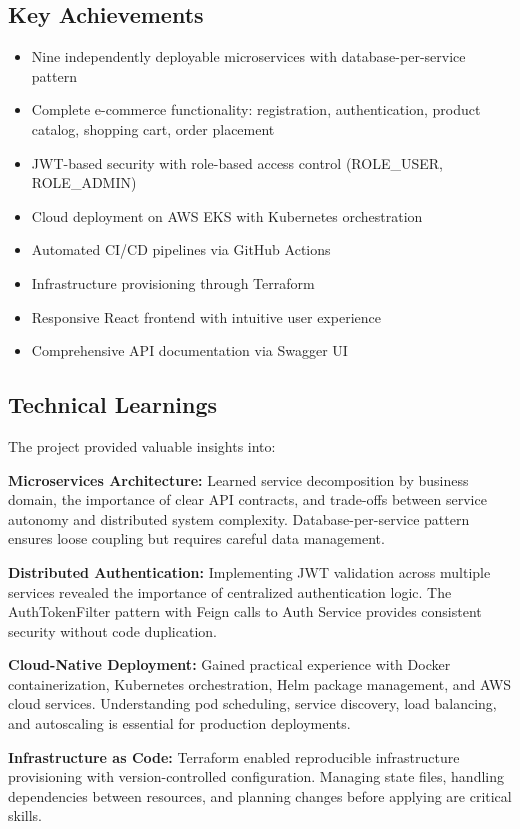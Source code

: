 \subsection{Key Achievements}

\begin{itemize}
    \item Nine independently deployable microservices with database-per-service pattern
    \item Complete e-commerce functionality: registration, authentication, product catalog, shopping cart, order placement
    \item JWT-based security with role-based access control (ROLE\_USER, ROLE\_ADMIN)
    \item Cloud deployment on AWS EKS with Kubernetes orchestration
    \item Automated CI/CD pipelines via GitHub Actions
    \item Infrastructure provisioning through Terraform
    \item Responsive React frontend with intuitive user experience
    \item Comprehensive API documentation via Swagger UI
\end{itemize}

\subsection{Technical Learnings}

The project provided valuable insights into:

\textbf{Microservices Architecture:} Learned service decomposition by business domain, the importance of clear API contracts, and trade-offs between service autonomy and distributed system complexity. Database-per-service pattern ensures loose coupling but requires careful data management.

\textbf{Distributed Authentication:} Implementing JWT validation across multiple services revealed the importance of centralized authentication logic. The AuthTokenFilter pattern with Feign calls to Auth Service provides consistent security without code duplication.

\textbf{Cloud-Native Deployment:} Gained practical experience with Docker containerization, Kubernetes orchestration, Helm package management, and AWS cloud services. Understanding pod scheduling, service discovery, load balancing, and autoscaling is essential for production deployments.

\textbf{Infrastructure as Code:} Terraform enabled reproducible infrastructure provisioning with version-controlled configuration. Managing state files, handling dependencies between resources, and planning changes before applying are critical skills.

